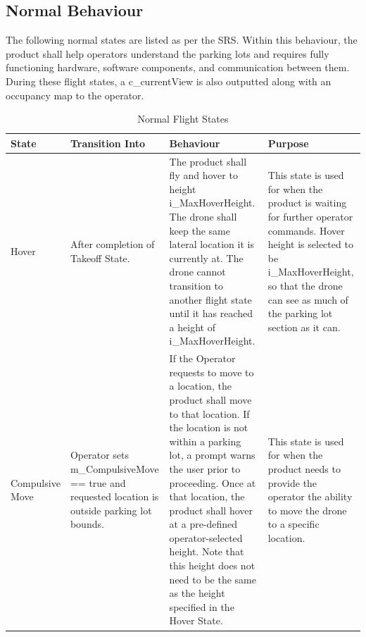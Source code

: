 \documentclass[12pt, titlepage]{article}
\begin{document}
\subsection{Normal Behaviour}
\label{subsec:NormalBeh}

The following normal states are listed as per the SRS. Within this behaviour, the product shall help operators understand the parking lots and requires fully functioning hardware, software components, and communication between them. During these flight states, a c\_currentView is also outputted along with an occupancy map to the operator.

\begin{table}[!h]
\begin{center}
\caption {Normal Flight States}
\label{FlightStates}
\begin{tabular}{ | m{2.1cm} | m{3cm} | m{6cm} | m{4cm} | } 
\hline
 State & Transition Into & Behaviour & Purpose \\ 
 \hline Hover & After completion of Takeoff State. & 
    The product shall fly and hover to height i\_MaxHoverHeight. The drone shall keep the same lateral location it is currently at. The drone cannot transition to another flight state until it has reached a height of i\_MaxHoverHeight. & 
    This state is used for when the product is waiting for further operator commands. Hover height is selected to be i\_MaxHoverHeight, so that the drone can see as much of the parking lot section as it  can. \\
\hline Compulsive Move & Operator sets m_CompulsiveMove == true and requested         location is outside parking lot bounds.	& 
    If the Operator requests to move to a location, the product shall move to that location. If the location is not within a parking lot, a prompt warns the user prior to proceeding. Once at that location, the product shall hover at a pre-defined operator-selected height. Note that this height does not need to be the same as the height specified in the Hover State.	&
    This state is used for when the product needs to provide the operator the ability to move the drone to a specific location. \\
\hline 
\end{tabular}
\end{center}
\end{table}
\end{document}
